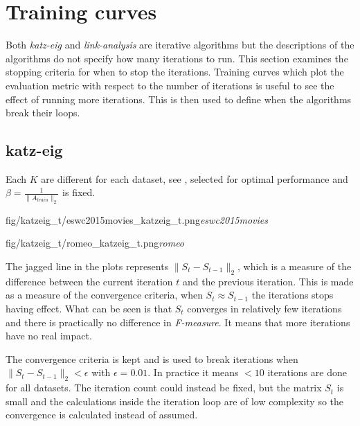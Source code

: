 
\section{Training curves}\label{sec:graphs:training_curves}

Both \textit{katz-eig} and \textit{link-analysis} are iterative algorithms but the descriptions of the algorithms do not specify how many iterations to run. This section examines the stopping criteria for when to stop the iterations.  Training curves which plot the evaluation metric with respect to the number of iterations is useful to see the effect of running more iterations. This is then used to define when the algorithms break their loops.

\newpage

\subsection{katz-eig}\label{sec:training:katz}

Each $K$ are different for each dataset, see , selected for optimal performance and $\beta = \frac{1}{\|A_{train}\|_2}$ is fixed.

\FloatBarrier

{fig/katzeig_t/eswc2015movies_katzeig_t.png}{\textit{eswc2015movies}}

{fig/katzeig_t/romeo_katzeig_t.png}{\textit{romeo}}

The jagged line in the plots represents $\|S_t - S_{t - 1}\|_2$, which is a measure of the difference between the current iteration $t$ and the previous iteration. This is made as a measure of the convergence criteria, when $S_t \approx S_{t - 1}$ the iterations stops having effect. What can be seen is that $S_t$ converges in relatively few iterations and there is practically no difference in \textit{F-measure}. It means that more iterations have no real impact.

\FloatBarrier %

The convergence criteria is kept and is used to break iterations when $\|S_t - S_{t - 1}\|_2 < \epsilon$ with $\epsilon = 0.01$. In practice it means $< 10$ iterations are done for all datasets. The iteration count could instead be fixed, but the matrix $S_t$ is small and the calculations inside the iteration loop are of low complexity so the convergence is calculated instead of assumed.

